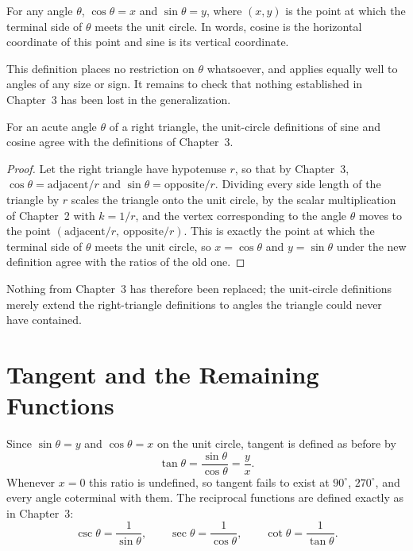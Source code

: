 \begin{definition}
For any angle $\theta$, $\cos\theta = x$ and $\sin\theta = y$, where $(x,y)$
is the point at which the terminal side of $\theta$ meets the unit circle.
In words, cosine is the horizontal coordinate of this point and sine is its
vertical coordinate.
\end{definition}

This definition places no restriction on $\theta$ whatsoever, and applies
equally well to angles of any size or sign. It remains to check that nothing
established in Chapter~3 has been lost in the generalization.

\begin{theorem}
For an acute angle $\theta$ of a right triangle, the unit-circle definitions
of sine and cosine agree with the definitions of Chapter~3.
\end{theorem}

\begin{proof}
Let the right triangle have hypotenuse $r$, so that by Chapter~3,
$\cos\theta = \text{adjacent}/r$ and $\sin\theta = \text{opposite}/r$.
Dividing every side length of the triangle by $r$ scales the triangle onto
the unit circle, by the scalar multiplication of Chapter~2 with $k = 1/r$,
and the vertex corresponding to the angle $\theta$ moves to the point
$\left(\text{adjacent}/r,\ \text{opposite}/r\right)$. This is exactly the
point at which the terminal side of $\theta$ meets the unit circle, so
$x = \cos\theta$ and $y = \sin\theta$ under the new definition agree with
the ratios of the old one.
\end{proof}

Nothing from Chapter~3 has therefore been replaced; the unit-circle
definitions merely extend the right-triangle definitions to angles the
triangle could never have contained.

\section{Tangent and the Remaining Functions}

Since $\sin\theta = y$ and $\cos\theta = x$ on the unit circle, tangent is
defined as before by
\[
\tan\theta = \frac{\sin\theta}{\cos\theta} = \frac{y}{x}.
\]
Whenever $x=0$ this ratio is undefined, so tangent fails to exist at
$90^\circ$, $270^\circ$, and every angle coterminal with them. The
reciprocal functions are defined exactly as in Chapter~3:
\[
\csc\theta = \frac{1}{\sin\theta}, \qquad
\sec\theta = \frac{1}{\cos\theta}, \qquad
\cot\theta = \frac{1}{\tan\theta}.
\]


